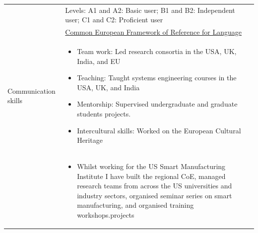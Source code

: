 \documentclass[11pt,a4paper]{article}
\begin{document}
\begin{tabular*}{\textwidth}[c]{@{}R{50mm}@{\hspace{6mm}}L{128mm}@{}}
    & \scriptsize{Levels: A1 and A2: Basic user; B1 and B2: Independent user; C1 and C2: Proficient user}\\[0mm]
    & \scriptsize{\href{https://europa.eu/europass/en/common-european-framework-reference-language-skills}{Common European Framework of Reference for Language}}\\[6mm]


    Communication skills &
    \begin{itemize}[before=\vspace{-2.7mm},leftmargin=4mm]
        \item Team work: Led research consortia in the USA, UK, India, and EU
        \item Teaching: Taught systems engineering courses in the USA, UK, and India
        \item Mentorship: Supervised undergraduate and graduate students projects.
        \item Intercultural skills: Worked on the European Cultural Heritage
    \end{itemize}\\[0mm]

    \hspace{-10mm}{Organisational/managerial skills} &
    \begin{itemize}[before=\vspace{-2.7mm},leftmargin=4mm]
        \item Whilst working for the US Smart Manufacturing Institute I have built the regional CoE, managed research teams from across the US universities and industry sectors, organised seminar series on smart manufacturing, and organised training workshops.projects
    \end{itemize}\\[0mm]


\end{tabular*}
\end{document}
